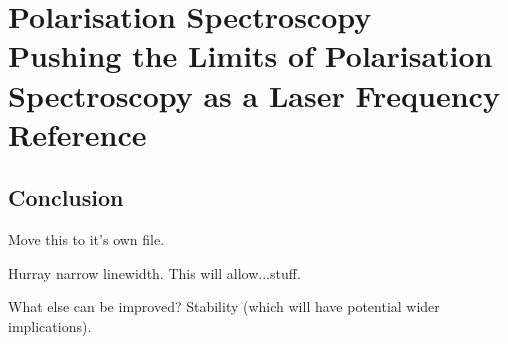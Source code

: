 \part[Polarisation Spectroscopy]{Polarisation Spectroscopy\\
\vspace{1cm}
\LARGE Pushing the Limits of Polarisation Spectroscopy as a Laser Frequency Reference}




\chapter{Conclusion}

Move this to it's own file.

Hurray narrow linewidth.
This will allow...stuff.

What else can be improved? Stability (which will have potential wider implications).

